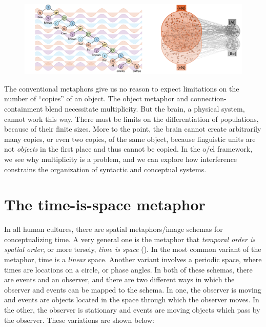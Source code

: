   
\begin{figure}
\includegraphics[width=\textwidth]{figures/Tilsen-img37.png}
\caption{\missingcaption}
\label{fig:}
\end{figure}
 

  The conventional metaphors give us no reason to expect limitations on the number of “copies” of an object. The object metaphor and connection-containment blend necessitate multiplicity. But the brain, a physical system, cannot work this way. There must be limits on the differentiation of populations, because of their finite sizes. More to the point, the brain cannot create arbitrarily many copies, or even two copies, of the same object, because linguistic units are not \textit{objects} in the first place and thus cannot be copied. In the o/el framework, we see why multiplicity is a problem, and we can explore how interference constrains the organization of syntactic and conceptual systems.

\section{The time-is-space metaphor}

In all human cultures, there are spatial metaphors/image schemas for conceptualizing time. A very general one is the metaphor that \textit{temporal order is spatial order}, or more tersely, \textit{time is space} (\citealt{Boroditsky20002001,CasasantoBoroditsky2008,Evans2006,GentnerEtAl2002,LakoffJohnson1999,NúñezEtAl2006}). In the most common variant of the metaphor, time is a \textit{linear} space. Another variant involves a periodic space, where times are locations on a circle, or phase angles. In both of these schemas, there are events and an observer, and there are two different ways in which the observer and events can be mapped to the schema. In one, the observer is moving and events are objects located in the space through which the observer moves. In the other, the observer is stationary and events are moving objects which pass by the observer. These variations are shown below:

